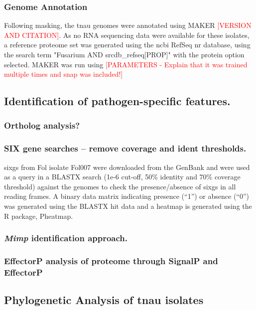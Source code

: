 \subsubsection{Genome Annotation}
Following masking, the \ac{tnau} genomes were annotated using MAKER \textcolor{red}{[VERSION AND CITATION]}. As no RNA sequencing data were available for these isolates, a reference proteome set was generated using the \ac{ncbi} RefSeq nr database, using the search term "Fusarium AND srcdb\_refseq[PROP]" with the protein option selected. MAKER was run using \textcolor{red}{[PARAMETERS - Explain that it was trained multiple times and snap was included!]}

\subsection{Identification of pathogen-specific features.}

\subsubsection{Ortholog analysis?}

\subsubsection{SIX gene searches – remove coverage and ident thresholds.}
\Acp{sixg} from Fol isolate Fol007 were downloaded from the GenBank and were used as a query in a BLASTX search (1e-6 cut-off, 50\% identity and 70\% coverage threshold) against the genomes to check the presence/absence of \acp{sixg} in all reading frames. A binary data matrix indicating presence (“1”) or absence (“0”) was generated using the BLASTX hit data and a heatmap is generated using the R package, Pheatmap.

\subsubsection{\textit{Mimp} identification approach.}

\subsubsection{EffectorP analysis of proteome through SignalP and EffectorP}


\subsection{Phylogenetic Analysis of \ac{tnau} isolates}\label{chap2:phylogeny}


